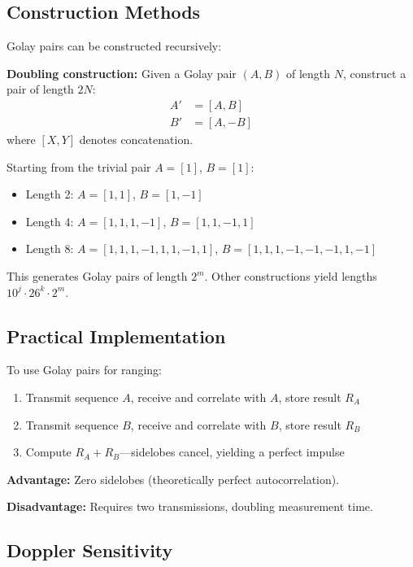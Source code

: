 \documentclass[11pt]{article}
\begin{document}
\subsection{Construction Methods}

Golay pairs can be constructed recursively:

\textbf{Doubling construction:} Given a Golay pair $(A, B)$ of length $N$, construct a pair of length $2N$:
\begin{align}
A' &= [A, B] \\
B' &= [A, -B]
\end{align}
where $[X, Y]$ denotes concatenation.

Starting from the trivial pair $A = [1]$, $B = [1]$:
\begin{itemize}
    \item Length 2: $A = [1, 1]$, $B = [1, -1]$
    \item Length 4: $A = [1, 1, 1, -1]$, $B = [1, 1, -1, 1]$
    \item Length 8: $A = [1, 1, 1, -1, 1, 1, -1, 1]$, $B = [1, 1, 1, -1, -1, -1, 1, -1]$
\end{itemize}

This generates Golay pairs of length $2^m$. Other constructions yield lengths $10^j \cdot 26^k \cdot 2^m$.

\subsection{Practical Implementation}

To use Golay pairs for ranging:
\begin{enumerate}
    \item Transmit sequence $A$, receive and correlate with $A$, store result $R_A$
    \item Transmit sequence $B$, receive and correlate with $B$, store result $R_B$
    \item Compute $R_A + R_B$---sidelobes cancel, yielding a perfect impulse
\end{enumerate}

\textbf{Advantage:} Zero sidelobes (theoretically perfect autocorrelation).

\textbf{Disadvantage:} Requires two transmissions, doubling measurement time.

\subsection{Doppler Sensitivity}
\end{document}
